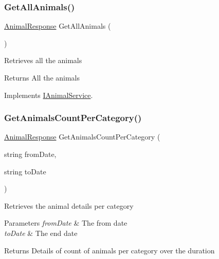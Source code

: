 \subsubsection{\texorpdfstring{Get\+All\+Animals()}{GetAllAnimals()}}
{\footnotesize\ttfamily \hyperlink{classWildLifeTracker_1_1Response_1_1AnimalResponse}{Animal\+Response} Get\+All\+Animals (\begin{DoxyParamCaption}{ }\end{DoxyParamCaption})\hspace{0.3cm}{\ttfamily [inline]}}



Retrieves all the animals 

\begin{DoxyReturn}{Returns}
All the animals
\end{DoxyReturn}


Implements \hyperlink{interfaceWildLifeTracker_1_1Services_1_1IAnimalService_a38b8ef318dc92ac93cfcbbc33a454c5a}{I\+Animal\+Service}.

\mbox{\label{classWildLifeTracker_1_1Services_1_1AnimalService_aa4dc53f849ee7b88879fa17f9d48bd42}} 
\subsubsection{\texorpdfstring{Get\+Animals\+Count\+Per\+Category()}{GetAnimalsCountPerCategory()}}
{\footnotesize\ttfamily \hyperlink{classWildLifeTracker_1_1Response_1_1AnimalResponse}{Animal\+Response} Get\+Animals\+Count\+Per\+Category (\begin{DoxyParamCaption}\item[{string}]{from\+Date,  }\item[{string}]{to\+Date }\end{DoxyParamCaption})\hspace{0.3cm}{\ttfamily [inline]}}



Retrieves the animal details per category 


\begin{DoxyParams}{Parameters}
{\em from\+Date} & The from date\\
\hline
{\em to\+Date} & The end date\\
\hline
\end{DoxyParams}
\begin{DoxyReturn}{Returns}
Details of count of animals per category over the duration
\end{DoxyReturn}



